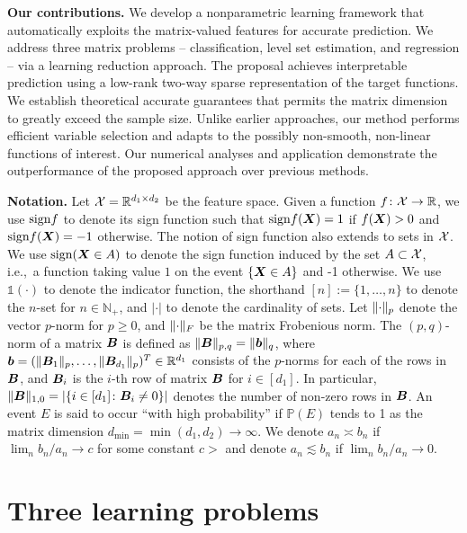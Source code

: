 \documentclass[11pt]{article}
\theoremstyle{definition}
\def\sign{\textup{sign}}
\begin{document}
{\bf Our contributions.} We develop a nonparametric learning framework that automatically exploits the matrix-valued features for accurate prediction. We address three matrix problems -- classification, level set estimation, and regression -- via a learning reduction approach. The proposal achieves interpretable prediction using a low-rank two-way sparse representation of the target functions. We establish theoretical accurate guarantees that permits the matrix dimension to greatly exceed the sample size. Unlike earlier approaches, our method performs efficient variable selection and adapts to the possibly non-smooth, non-linear functions of interest. Our numerical analyses and application demonstrate the outperformance of the proposed approach over previous methods. 


 
{\bf Notation.} Let $\mathcal{X}=\mathbb{R}^{d_1\times d_2}$ be the feature space. Given a function $f\colon \mathcal{X} \to \mathbb{R}$, we use $\sign f$ to denote its sign function such that $\sign f(\mX)=1$ if $f(\bm X)>0$ and $\sign f(\mX)=-1$ otherwise. The notion of sign function also extends to sets in $\mathcal{X}$. We use $\sign (\mX\in A)$ to denote the sign function induced by the set $A\subset\mathcal{X}$, i.e.,\ a function taking value $1$ on the event $\{\bm X\in A\}$ and -1 otherwise. We use $\mathds{1}(\cdot)$ to denote the indicator function, the shorthand $[n]:=\{1,\ldots,n\}$ to denote the $n$-set for $n\in\mathbb{N}_{+}$, and $|\cdot|$ to denote the cardinality of sets. Let $\lVert\cdot\rVert_p$ denote the vector $p$-norm for $p\geq 0$, and $\lVert\cdot\rVert_F$ be the matrix Frobenious norm. The $(p,q)$-norm of a matrix $\bm B$ is defined as $\lVert\bm B\rVert_{p,q}=\lVert\bm{b}\rVert_q$, where $\bm{b}=(\lVert\bm B_1\rVert_p,\ldots,\lVert\bm B_{d_1}\rVert_p)^T\in\mathbb{R}^{d_1}$ consists of the $p$-norms for each of the rows in $\bm B$, and $\bm B_i$ is the $i$-th row of matrix $\bm B$ for $i\in[d_1]$. In particular, $\lVert\bm B\rVert_{1,0}=|\{i\in [d_1]\colon \bm B_i\neq 0\}|$ denotes the number of non-zero rows in $\bm B$. An event $E$ is said to occur ``with high probability'' if $\mathbb{P}(E)$ tends to 1 as the matrix dimension $d_{\min}=\min(d_1,d_2)\to\infty$. We denote $a_n\asymp b_n$ if $\lim_n b_n/a_n\rightarrow c$ for some constant $c>$ and denote $a_n\lesssim b_n$ if $\lim_n b_n/a_n\rightarrow 0.$ 

\vspace{-.5cm}
\section{Three learning problems}
\vspace{-.5cm}
\end{document}
